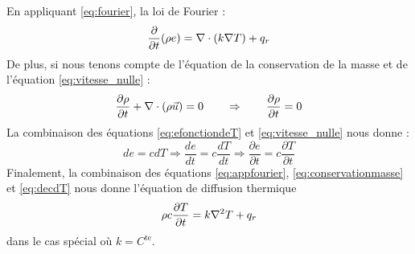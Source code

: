 En appliquant \ref{eq:fourier}, la loi de Fourier :
\begin{equation} \frac{\partial}{\partial t}(\rho e) = \nabla \cdot(k\nabla T) + q_r \label{eq:appfourier}\end{equation}
De plus, si nous tenons compte de l'équation de la conservation de la masse et de l'équation \ref{eq:vitesse_nulle} :
\begin{equation} \frac{\partial\rho}{\partial t} + \nabla \cdot(\rho\vec{u}) = 0 \qquad \Rightarrow \qquad \frac{\partial\rho}{\partial t} = 0 \label{eq:conservationmasse}\end{equation}
La combinaison des équations \ref{eq:efonctiondeT} et \ref{eq:vitesse_nulle} nous donne :
\begin{equation} de = cdT \Rightarrow \frac{de}{dt} = c\frac{dT}{dt} \Rightarrow \frac{\partial e}{\partial t} = c\frac{\partial T}{\partial t} \label{eq:decdT}\end{equation}
Finalement, la combinaison des équations \ref{eq:appfourier}, \ref{eq:conservationmasse} et \ref{eq:decdT} nous donne l'équation de diffusion thermique
\begin{equation} \rho c\frac{\partial T}{\partial t} = k\nabla ^2T + q_r \label{eq:chaleur}\end{equation}
dans le cas spécial où $k = C^\text{te}$.

